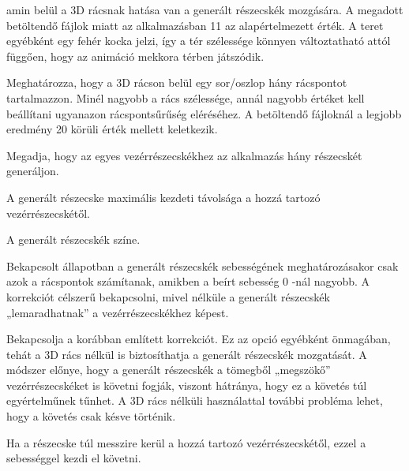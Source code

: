 \begin{description}[font=\normalfont\itshape\space]
\begin{description}[font=\normalfont\itshape\space]
amin belül a 3D rácsnak hatása van a generált részecskék mozgására. 
A megadott betöltendő fájlok miatt az alkalmazásban 11 az alapértelmezett érték. 
A teret egyébként egy fehér kocka jelzi, 
így a tér szélessége könnyen változtatható attól függően, 
hogy az animáció mekkora térben játszódik. 
\item [grid splitting:] Meghatározza, 
hogy a 3D rácson belül egy sor/oszlop hány rácspontot tartalmazzon. 
Minél nagyobb a rács szélessége, 
annál nagyobb értéket kell beállítani ugyanazon rácspontsűrűség eléréséhez. 
A betöltendő fájloknál a legjobb eredmény 20 körüli érték mellett keletkezik.
\end{description}
\item [\textbf{generated particles:}]
\begin{description}[font=\normalfont\itshape\space]
\item []
\item [num of particles:] Megadja, 
hogy az egyes vezérrészecskékhez az alkalmazás hány részecskét generáljon.
\item [Max distance:] 
A generált részecske maximális kezdeti távolsága a hozzá tartozó vezérrészecskétől.
\item [particle color:] 
A generált részecskék színe.
\end{description}
\item [\textbf{Corrections:}]
\begin{description}[font=\normalfont\itshape\space]
\item []
\item [ignore null velocity:] 
Bekapcsolt állapotban 
a generált részecskék sebességének meghatározásakor 
csak azok a rácspontok számítanak, 
amikben a beírt sebesség 0 -nál nagyobb. 
A korrekciót célszerű bekapcsolni, 
mivel nélküle a generált részecskék „lemaradhatnak” a vezérrészecskékhez képest.
\item [follow controllpoints:] 
Bekapcsolja a korábban említett korrekciót. 
Ez az opció egyébként önmagában, 
tehát a 3D rács nélkül is biztosíthatja a generált részecskék mozgatását. 
A módszer előnye, 
hogy a generált részecskék a tömegből „megszökő” vezérrészecskéket is követni fogják, 
viszont hátránya, hogy ez a követés túl egyértelműnek tűnhet. 
A 3D rács nélküli használattal további probléma lehet, 
hogy a követés csak késve történik.
\item [Follow speed:] 
Ha a részecske túl messzire kerül 
a hozzá tartozó vezérrészecskétől, 
ezzel a sebességgel kezdi el követni.
\item [random r:] 

\end{description}
\end{description}

